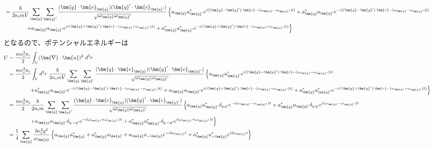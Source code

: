 \documentclass[dvipdfmx, 11pt, a4paper]{jsarticle}
\numberwithin{equation}{section}
\theoremstyle{definition}
\begin{document}
\begin{derivationBox}
\begin{align}
            &= \frac{\hbar}{2n_imV} \sum_{\bm{q}}\sum_{\bm{q}'} \frac{(\bm{q}\cdot \bm{e}_{\bm{q}})(\bm{q}'\cdot \bm{e}_{\bm{q}'})}{\sqrt{\omega_{\bm{q}}\omega_{\bm{q}'}}} \left\{ a_{\bm{q}}a_{\bm{q}'}^* e^{i((\bm{q}-\bm{q}')\cdot \bm{r} - (\omega_{\bm{q}}-\omega_{\bm{q}'})t)} + a_{\bm{q}}^*a_{\bm{q}'} e^{-i((\bm{q}-\bm{q}')\cdot \bm{r} - (\omega_{\bm{q}}-\omega_{\bm{q}'})t)} \right. \notag \\
            &\ \ \ \ \ \ \ \ \ \ \ \ \left. +a_{\bm{q}}a_{\bm{q}'} e^{i((\bm{q}+\bm{q}')\cdot \bm{r} - (\omega_{\bm{q}}+\omega_{\bm{q}'})t)} + a_{\bm{q}}^*a_{\bm{q}'}^* e^{-i((\bm{q}+\bm{q}')\cdot \bm{r} - (\omega_{\bm{q}}+\omega_{\bm{q}'})t)}\right\}
        \end{align}
        となるので、ポテンシャルエネルギーは
        \begin{align}
            U &= \frac{mv_s^2n_i}{2} \int_V(\bm{\nabla} \cdot \bm{u})^2\ d^3r \notag \\
            &= \frac{mv_s^2n_i}{2} \int_Vd^3r\ \frac{\hbar}{2n_imV} \sum_{\bm{q}}\sum_{\bm{q}'} \frac{(\bm{q}\cdot \bm{e}_{\bm{q}})(\bm{q}'\cdot \bm{e}_{\bm{q}'})}{\sqrt{\omega_{\bm{q}}\omega_{\bm{q}'}}} \left\{ a_{\bm{q}}a_{\bm{q}'}^* e^{i((\bm{q}-\bm{q}')\cdot \bm{r} - (\omega_{\bm{q}}-\omega_{\bm{q}'})t)}  \right. \notag \\
            &\ \ \ \ \ \ \ \ \ \ \ \ \left. + a_{\bm{q}}^*a_{\bm{q}'} e^{-i((\bm{q}-\bm{q}')\cdot \bm{r} - (\omega_{\bm{q}}-\omega_{\bm{q}'})t)} +a_{\bm{q}}a_{\bm{q}'} e^{i((\bm{q}+\bm{q}')\cdot \bm{r} - (\omega_{\bm{q}}+\omega_{\bm{q}'})t)} + a_{\bm{q}}^*a_{\bm{q}'}^* e^{-i((\bm{q}+\bm{q}')\cdot \bm{r} - (\omega_{\bm{q}}+\omega_{\bm{q}'})t)}\right\} \notag \\
            &= \frac{mv_s^2n_i}{2} \frac{\hbar}{2n_im} \sum_{\bm{q}}\sum_{\bm{q}'} \frac{(\bm{q}\cdot \bm{e}_{\bm{q}})(\bm{q}'\cdot \bm{e}_{\bm{q}'})}{\sqrt{\omega_{\bm{q}}\omega_{\bm{q}'}}} \left\{ a_{\bm{q}}a_{\bm{q}'}^* \delta_{q,q'} e^{-i (\omega_{\bm{q}}-\omega_{\bm{q}'})t} + a_{\bm{q}}^*a_{\bm{q}'} \delta_{q,q'}e^{i(\omega_{\bm{q}}-\omega_{\bm{q}'})t}  \right. \notag \\
            &\ \ \ \ \ \ \ \ \ \ \ \ \left. +a_{\bm{q}}a_{\bm{q}'} \delta_{q,-q'} e^{-i(\omega_{\bm{q}}+\omega_{\bm{q}'})t} + a_{\bm{q}}^*a_{\bm{q}'}^* \delta_{q,-q'}e^{i(\omega_{\bm{q}}+\omega_{\bm{q}'})t}\right\} \notag \\
            &= \frac{1}{4} \sum_{\bm{q}} \frac{\hbar v_s^2 q^2}{\omega_{\bm{q}}} \left\{ a_{\bm{q}}a_{\bm{q}}^*   + a_{\bm{q}}^*a_{\bm{q}} +a_{\bm{q}}a_{-\bm{q}} e^{-i2\omega_{\bm{q}}t} + a_{\bm{q}}^*a_{-\bm{q}}^* e^{i2\omega_{\bm{q}}t}\right\} \notag \\

\end{align}
\end{derivationBox}
\end{document}
